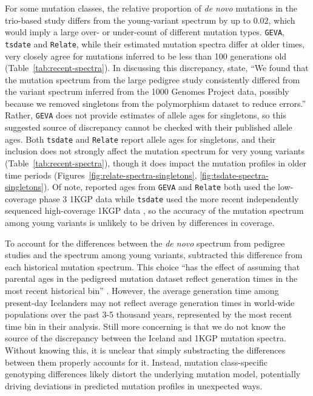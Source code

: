 \documentclass[]{article}
\newcommand{\GEVA}{\texttt{GEVA}\xspace}
\newcommand{\tsdate}{\texttt{tsdate}\xspace}
\newcommand{\relate}{\texttt{Relate}\xspace}
\begin{document}
For some mutation classes, the relative proportion of \emph{de novo} mutations
in the trio-based study differs from the young-variant spectrum by up to
$0.02$, which would imply a large over- or under-count of different mutation
types. \GEVA, \tsdate and \relate, while their estimated mutation spectra
differ at older times, very closely agree for mutations inferred to be less
than 100 generations old (Table~\ref{tab:recent-spectra}). In discussing this
discrepancy, \citet{wang2023human} state, ``We found that the mutation spectrum
from the large pedigree study consistently differed from the variant spectrum
inferred from the 1000 Genomes Project data, possibly because we removed
singletons from the polymorphism dataset to reduce errors.'' Rather, \GEVA does
not provide estimates of allele ages for singletons, so this suggested source
of discrepancy cannot be checked with their published allele ages. Both \tsdate
and \relate report allele ages for singletons, and their inclusion does not
strongly affect the mutation spectrum for very young variants
(Table~\ref{tab:recent-spectra}), though it does impact the mutation profiles
in older time periods (Figures~\ref{fig:relate-spectra-singletons},
\ref{fig:tsdate-spectra-singletons}). Of note, reported ages from \GEVA and
\relate both used the low-coverage phase 3 1KGP data while \tsdate used the
more recent independently sequenced high-coverage 1KGP data
\citep{byrska2022high}, so the accuracy of the mutation spectrum among young
variants is unlikely to be driven by differences in coverage.

To account for the differences between the \emph{de novo} spectrum from
pedigree studies \citep{jonsson2017parental} and the spectrum among young
variants, \citet{wang2023human} subtracted this difference from each historical
mutation spectrum. This choice ``has the effect of assuming that parental ages
in the pedigreed mutation dataset reflect generation times in the most recent
historical bin'' \citep{wang2023human}. However, the average generation time
among present-day Icelanders may not reflect average generation times in
world-wide populations over the past 3-5 thousand years, represented by the
most recent time bin in their analysis. Still more concerning is that we do not
know the source of the discrepancy between the Iceland and 1KGP mutation
spectra. Without knowing this, it is unclear that simply substracting the
differences between them properly accounts for it. Instead, mutation
class-specific genotyping differences likely distort the underlying mutation
model, potentially driving deviations in predicted mutation profiles in
unexpected ways.
\end{document}
